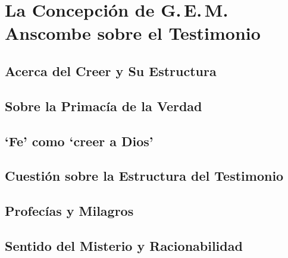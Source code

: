 \documentclass[./main.tex]{subfiles}
\begin{document}



%

%

%

%

\chapter{La Concepción de G.\,E.\,M.\,Anscombe sobre el Testimonio}

\section{Acerca del Creer y Su Estructura}

\section{Sobre la Primacía de la Verdad}

\section{`Fe' como `creer a Dios'}

\section{Cuestión sobre la Estructura del Testimonio}

\section{Profecías y Milagros}

\section{Sentido del Misterio y Racionabilidad}
\end{document}
